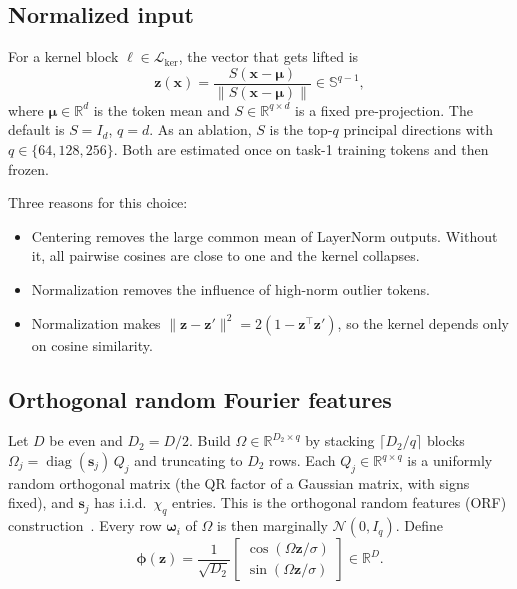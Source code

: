 \documentclass[11pt]{article}
\theoremstyle{plain}
\theoremstyle{definition}
\theoremstyle{remark}
\newcommand{\R}{\mathbb{R}}
\newcommand{\Lk}{\mathcal{L}_{\mathrm{ker}}}
\newcommand{\x}{\bm{x}}
\newcommand{\z}{\bm{z}}
\newcommand{\vphi}{\bm{\phi}}
\newcommand{\vmu}{\bm{\mu}}
\begin{document}
\subsection{Normalized input}
For a kernel block $\ell\in\Lk$, the vector that gets lifted is
\begin{equation}\label{eq:z}
\z(\x)=\frac{S(\x-\vmu)}{\|S(\x-\vmu)\|}\in\mathbb S^{q-1},
\end{equation}
where $\vmu\in\R^{d}$ is the token mean and $S\in\R^{q\times d}$ is a fixed pre-projection. The default is $S=I_d$, $q=d$. As an ablation, $S$ is the top-$q$ principal directions with $q\in\{64,128,256\}$. Both are estimated once on task-1 training tokens and then frozen.

Three reasons for this choice:
\begin{itemize}[nosep]
\item Centering removes the large common mean of LayerNorm outputs. Without it, all pairwise cosines are close to one and the kernel collapses.
\item Normalization removes the influence of high-norm outlier tokens.
\item Normalization makes $\|\z-\z'\|^2=2(1-\z^{\top}\z')$, so the kernel depends only on cosine similarity.
\end{itemize}

\subsection{Orthogonal random Fourier features}
Let $D$ be even and $D_2=D/2$. Build $\Omega\in\R^{D_2\times q}$ by stacking $\lceil D_2/q\rceil$ blocks $\Omega_j=\operatorname{diag}(\bm s_j)\,Q_j$ and truncating to $D_2$ rows. Each $Q_j\in\R^{q\times q}$ is a uniformly random orthogonal matrix (the QR factor of a Gaussian matrix, with signs fixed), and $\bm s_j$ has i.i.d.\ $\chi_q$ entries. This is the orthogonal random features (ORF) construction~\cite{orf}. Every row $\bm\omega_i$ of $\Omega$ is then marginally $\mathcal N(0,I_q)$. Define
\begin{equation}\label{eq:rff}
\vphi(\z)=\frac{1}{\sqrt{D_2}}
\begin{bmatrix}\cos(\Omega\z/\sigma)\\ \sin(\Omega\z/\sigma)\end{bmatrix}\in\R^{D}.
\end{equation}
\end{document}

